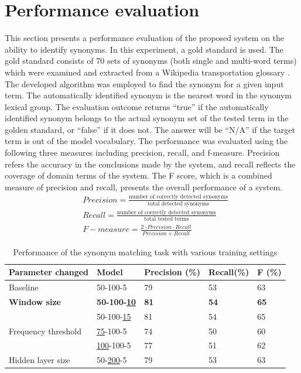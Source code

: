\documentclass[Journal, BackFigs,NoLists, DoubleSpace]{ascelike}%
\begin{document}
\section{Performance evaluation} \label{sec:eval_RoadLex}
This section presents a performance evaluation of the proposed system on the ability to identify synonyms. In this experiment, a gold standard is used. The gold standard consists of 70 sets of synonyms (both single and multi-word terms) which were examined and extracted from a Wikipedia transportation glossary \cite{wikipedia16}. The developed algorithm was employed to find the synonym for a given input term. The automatically identified synonym is the nearest word in the synonym lexical group. The evaluation outcome returns ``true'' if the automatically identified synonym belongs to the actual synonym set of the tested term in the golden standard, or ``false'' if it does not. The answer will be ``N/A'' if the target term is out of the model vocabulary. The performance was evaluated using the following three measures including precision, recall, and f-measure. Precision refers the accuracy in the conclusions made by the system, and recall reflects the coverage of domain terms of the system. The F score, which is a combined measure of precision and recall, presents the overall performance of a system. 
%
\begin{align} 
&Precision = \frac{\text{number of correctly detected synonyms}}{\text{total detected synonyms}}  \\
&Recall = \frac{\text{number of correctly detected synonyms}}{\text{total tested terms}}  \\ 
&F-measure = \frac{2 \cdot Precision \cdot Recall}{Precision+Recall}
\end{align}
\begin{table} [b] 
	\caption{Performance of the synonym matching task with various training settings}
	\label{table:eval_syn_par_effect}
	\centering
	\small
	\renewcommand{\arraystretch}{1.25}
	\begin{tabular}{l l l l l }
		\hline
		\hline
		\textbf{Parameter changed} & \textbf{Model} & \textbf{Precision (\%)}  & \textbf{Recall(\%)} & \textbf{F (\%)}\\
		\hline
		Baseline	&	50-100-5	&79		&53		&63\\
		\hline
		\textbf{Window size}	&\textbf{50-100-\underline{10}}	&\textbf{81}		&\textbf{54}		&\textbf{65}\\
		&50-100-\underline{15}	&81		&54		&65\\
		\hline		
		Frequency threshold	&\underline{75}-100-5	&74		&50		&60\\
		&\underline{100}-100-5	&77		&51		&62\\
		\hline
		Hidden layer size	&50-\underline{200}-5	&79		&53		&63\\
		\hline
		\hline
	\end{tabular}
	\normalsize
\end{table}
\end{document}
